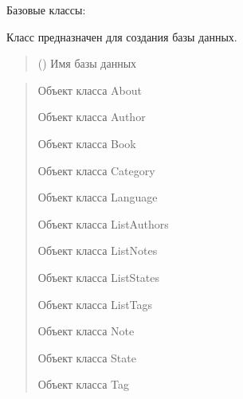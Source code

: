 \documentclass[letterpaper,10pt,russian]{sphinxmanual}
\begin{document}
\begin{fulllineitems}
\label{\detokenize{database.sqlite3_interface:database.sqlite3_interface.create_db.CreateDataBase}}
\pysigstartsignatures
{}
\pysigstopsignatures
\sphinxAtStartPar
Базовые классы: 

\sphinxAtStartPar
Класс предназначен для создания базы данных.
\begin{quote}\begin{description}
\sphinxAtStartPar
{} () \textendash{} Имя базы данных

\end{description}\end{quote}
\begin{description}
\begin{quote}\begin{description}
\sphinxAtStartPar
Объект класса About

\sphinxAtStartPar
Объект класса Author

\sphinxAtStartPar
Объект класса Book

\sphinxAtStartPar
Объект класса Category

\sphinxAtStartPar
Объект класса Language

\sphinxAtStartPar
Объект класса ListAuthors

\sphinxAtStartPar
Объект класса ListNotes

\sphinxAtStartPar
Объект класса ListStates

\sphinxAtStartPar
Объект класса ListTags

\sphinxAtStartPar
Объект класса Note

\sphinxAtStartPar
Объект класса State

\sphinxAtStartPar
Объект класса Tag


\end{description}
\end{quote}
\end{description}
\end{fulllineitems}
\end{document}
